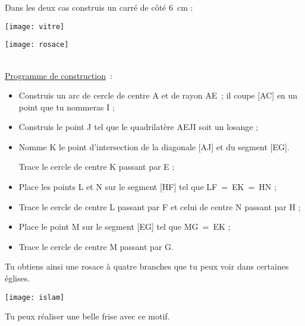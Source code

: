 \begin{enigme}

Dans les deux cas construis un carré de côté 6 cm :

\begin{minipage}[c]{0.2\linewidth}
\texttt{[image: vitre]}
\end{minipage} \hfill%
\begin{minipage}[c]{0.76\linewidth}
\texttt{[image: rosace]}
\end{minipage} \\

\underline{Programme de construction} :
\begin{itemize}
 \item Construis un arc de cercle de centre A et de rayon AE ; il coupe [AC] en un point que tu nommeras I ;
 \item Construis le point J tel que le quadrilatère AEJI soit un losange ;
 \item Nomme K le point d'intersection de la diagonale [AJ] et du segment [EG].
                
Trace le cercle de centre K passant par E ;
 \item Place les points L et N sur le segment [HF] tel que LF = EK = HN ;
 \item Trace le cercle de centre L passant par F et celui de centre N passant par H ;
 \item Place le point M sur le segment [EG] tel que MG = EK ;
 \item Trace le cercle de centre M passant par G.
 \end{itemize}
Tu obtiens ainsi une rosace à quatre branches que tu peux voir dans certaines églises.
 
 \end{enigme}
 
 \vspace*{2em}
 

\begin{enigme}
\vspace{0.5cm}
\texttt{[image: islam]}

Tu peux réaliser une belle frise avec ce motif.
\end{enigme} 
